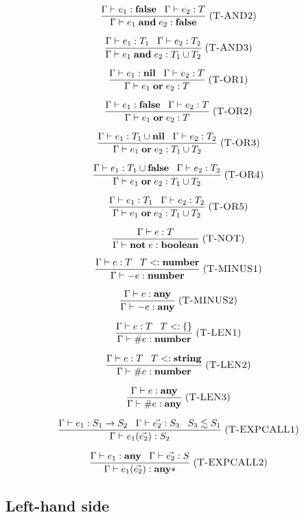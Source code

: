 \documentclass[12pt]{article}
\newcommand{\Any}{\mathbf{any}}
\newcommand{\Nil}{\mathbf{nil}}
\newcommand{\False}{\mathbf{false}}
\newcommand{\Boolean}{\mathbf{boolean}}
\newcommand{\Number}{\mathbf{number}}
\newcommand{\String}{\mathbf{string}}
\newcommand{\kw}[1]{\mathbf{#1}}
\newcommand{\mylabel}[1]{\; (\textsc{#1})}
\newcommand{\subtype}{<:}
\newcommand{\env}{\Gamma}
\begin{document}
\[
\frac{\env \vdash e_{1}:\False \;\;\;
      \env \vdash e_{2}:T}
     {\env \vdash e_{1} \; \kw{and} \; e_{2} : \False}
\mylabel{T-AND2}
\]

\[
\frac{\env \vdash e_{1}:T_{1} \;\;\;
      \env \vdash e_{2}:T_{2}}
     {\env \vdash e_{1} \; \kw{and} \; e_{2} : T_{1} \cup T_{2}}
\mylabel{T-AND3}
\]

\[
\frac{\env \vdash e_{1}:\Nil \;\;\;
      \env \vdash e_{2}:T}
     {\env \vdash e_{1} \; \kw{or} \; e_{2} : T}
\mylabel{T-OR1}
\]

\[
\frac{\env \vdash e_{1}:\False \;\;\;
      \env \vdash e_{2}:T}
     {\env \vdash e_{1} \; \kw{or} \; e_{2} : T}
\mylabel{T-OR2}
\]

\[
\frac{\env \vdash e_{1}:T_{1} \cup \Nil \;\;\;
      \env \vdash e_{2}:T_{2}}
     {\env \vdash e_{1} \; \kw{or} \; e_{2} : T_{1} \cup T_{2}}
\mylabel{T-OR3}
\]

\[
\frac{\env \vdash e_{1}:T_{1} \cup \False \;\;\;
      \env \vdash e_{2}:T_{2}}
     {\env \vdash e_{1} \; \kw{or} \; e_{2} : T_{1} \cup T_{2}}
\mylabel{T-OR4}
\]

\[
\frac{\env \vdash e_{1}:T_{1} \;\;\;
      \env \vdash e_{2}:T_{2}}
     {\env \vdash e_{1} \; \kw{or} \; e_{2} : T_{1} \cup T_{2}}
\mylabel{T-OR5}
\]

\[
\frac{\env \vdash e:T}
     {\env \vdash \kw{not} \; e : \Boolean}
\mylabel{T-NOT}
\]

\[
\frac{\env \vdash e:T \;\;\;
      T \subtype \Number}
     {\env \vdash - e : \Number}
\mylabel{T-MINUS1}
\]

\[
\frac{\env \vdash e:\Any}
     {\env \vdash - e : \Any}
\mylabel{T-MINUS2}
\]

\[
\frac{\env \vdash e:T \;\;\;
      T \subtype \{\}}
     {\env \vdash \# e : \Number}
\mylabel{T-LEN1}
\]

\[
\frac{\env \vdash e:T \;\;\;
      T \subtype \String}
     {\env \vdash \# e : \Number}
\mylabel{T-LEN2}
\]

\[
\frac{\env \vdash e:\Any}
     {\env \vdash \# e : \Any}
\mylabel{T-LEN3}
\]

\[
\frac{\env \vdash e_{1}:S_{1} \rightarrow S_{2} \;\;\;
      \env \vdash \vec{e_{2}}:S_{3} \;\;\;
      S_{3} \lesssim S_{1}}
     {\env \vdash e_{1}(\vec{e_{2}}) : S_{2}}
\mylabel{T-EXPCALL1}
\]

\[
\frac{\env \vdash e_{1}:\Any \;\;\;
      \env \vdash \vec{e_{2}}:S}
     {\env \vdash e_{1}(\vec{e_{2}}) : \Any{*}}
\mylabel{T-EXPCALL2}
\]

\subsection{Left-hand side}
\end{document}
